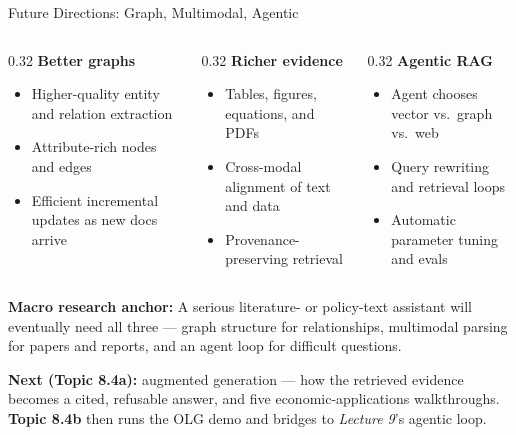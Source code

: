 \begin{frame}{Future Directions: Graph, Multimodal, Agentic}
\small
\begin{columns}[T]
\begin{column}{0.32\textwidth}
\textbf{Better graphs}
\begin{itemize}
    \item Higher-quality entity and relation extraction
    \item Attribute-rich nodes and edges
    \item Efficient incremental updates as new docs arrive
\end{itemize}
\end{column}
\begin{column}{0.32\textwidth}
\textbf{Richer evidence}
\begin{itemize}
    \item Tables, figures, equations, and PDFs
    \item Cross-modal alignment of text and data
    \item Provenance-preserving retrieval
\end{itemize}
\end{column}
\begin{column}{0.32\textwidth}
\textbf{Agentic RAG}
\begin{itemize}
    \item Agent chooses vector vs.\ graph vs.\ web
    \item Query rewriting and retrieval loops
    \item Automatic parameter tuning and evals
\end{itemize}
\end{column}
\end{columns}

\bigskip
\textbf{Macro research anchor:} A serious literature- or policy-text assistant will eventually need all three --- graph structure for relationships, multimodal parsing for papers and reports, and an agent loop for difficult questions.

\medskip
\textbf{Next (Topic 8.4a):} augmented generation --- how the retrieved evidence becomes a cited, refusable answer, and five economic-applications walkthroughs. \textbf{Topic 8.4b} then runs the OLG demo and bridges to \emph{Lecture 9}'s agentic loop.
\end{frame}



